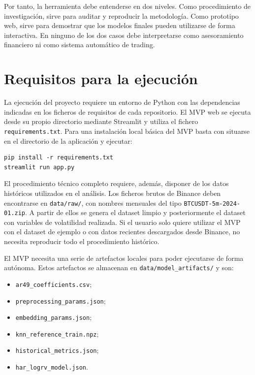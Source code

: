 Por tanto, la herramienta debe entenderse en dos niveles. Como procedimiento de investigación, sirve para auditar y reproducir la metodología. Como prototipo web, sirve para demostrar que los modelos finales pueden utilizarse de forma interactiva. En ninguno de los dos casos debe interpretarse como asesoramiento financiero ni como sistema automático de trading.

\section{Requisitos para la ejecución}\label{sec:requisitos-ejecucion}

La ejecución del proyecto requiere un entorno de Python con las dependencias indicadas en los ficheros de requisitos de cada repositorio. El MVP web se ejecuta desde su propio directorio mediante Streamlit y utiliza el fichero \texttt{requirements.txt}. Para una instalación local básica del MVP basta con situarse en el directorio de la aplicación y ejecutar:

\begin{verbatim}
pip install -r requirements.txt
streamlit run app.py
\end{verbatim}

El procedimiento técnico completo requiere, además, disponer de los datos históricos utilizados en el análisis. Los ficheros brutos de Binance deben encontrarse en \texttt{data/\allowbreak raw/}, con nombres mensuales del tipo \texttt{BTCUSDT-5m-2024-01.zip}. A partir de ellos se genera el dataset limpio y posteriormente el dataset con variables de volatilidad realizada. Si el usuario solo quiere utilizar el MVP con el dataset de ejemplo o con datos recientes descargados desde Binance, no necesita reproducir todo el procedimiento histórico.

El MVP necesita una serie de artefactos locales para poder ejecutarse de forma autónoma. Estos artefactos se almacenan en \texttt{data/\allowbreak model\_\allowbreak artifacts/} y son:

\begin{itemize}
    \item \texttt{ar49\_\allowbreak coefficients.csv};
    \item \texttt{preprocessing\_\allowbreak params.json};
    \item \texttt{embedding\_\allowbreak params.json};
    \item \texttt{knn\_\allowbreak reference\_\allowbreak train.npz};
    \item \texttt{historical\_\allowbreak metrics.json};
    \item \texttt{har\_\allowbreak logrv\_\allowbreak model.json}.
\end{itemize}

